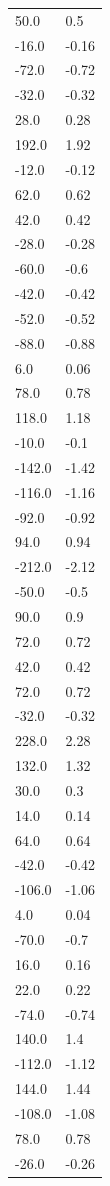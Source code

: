 \begin{longtable}{ll}
50.0 & 0.5 \\
-16.0 & -0.16 \\
-72.0 & -0.72 \\
-32.0 & -0.32 \\
28.0 & 0.28 \\
192.0 & 1.92 \\
-12.0 & -0.12 \\
62.0 & 0.62 \\
42.0 & 0.42 \\
-28.0 & -0.28 \\
-60.0 & -0.6 \\
-42.0 & -0.42 \\
-52.0 & -0.52 \\
-88.0 & -0.88 \\
6.0 & 0.06 \\
78.0 & 0.78 \\
118.0 & 1.18 \\
-10.0 & -0.1 \\
-142.0 & -1.42 \\
-116.0 & -1.16 \\
-92.0 & -0.92 \\
94.0 & 0.94 \\
-212.0 & -2.12 \\
-50.0 & -0.5 \\
90.0 & 0.9 \\
72.0 & 0.72 \\
42.0 & 0.42 \\
72.0 & 0.72 \\
-32.0 & -0.32 \\
228.0 & 2.28 \\
132.0 & 1.32 \\
30.0 & 0.3 \\
14.0 & 0.14 \\
64.0 & 0.64 \\
-42.0 & -0.42 \\
-106.0 & -1.06 \\
4.0 & 0.04 \\
-70.0 & -0.7 \\
16.0 & 0.16 \\
22.0 & 0.22 \\
-74.0 & -0.74 \\
140.0 & 1.4 \\
-112.0 & -1.12 \\
144.0 & 1.44 \\
-108.0 & -1.08 \\
78.0 & 0.78 \\
-26.0 & -0.26 \\

\end{longtable}
